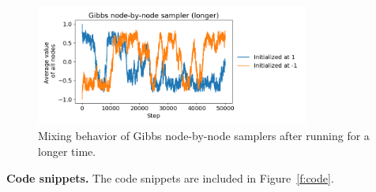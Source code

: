 \documentclass{article}
\begin{document}
\begin{figure}[h]
\centering
\includegraphics[width=0.8\textwidth]{./computational/gibbs_node_sampler_mixing_longer.png}
\vspace{-0.6cm}
\caption{Mixing behavior of Gibbs node-by-node samplers after running for a longer time.}
\label{f:63f}
\end{figure}

\noindent
\textbf{Code snippets.}
The code snippets are included in Figure~\ref{f:code}.
%
\end{document}
